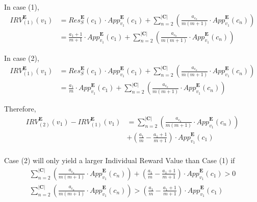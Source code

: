 \documentclass{article}
\begin{document}
In case (1), 
\begin{equation}
\begin{aligned}
{IRV}^{\boldsymbol{E}}_{(1)}(v_1) 
&= {Res}^{\boldsymbol{E}}_{S}(c_1)\cdot{App}^{\boldsymbol{E}}_{v_1}(c_1) + \sum^{|\boldsymbol{C}|}_{n = 2}{\left(\frac{a_{c_n}}{m(m+1)}\cdot{App}^{\boldsymbol{E}}_{v_1}(c_{n})\right)}\\
&= \frac{a_1+1}{m+1}\cdot{App}^{\boldsymbol{E}}_{v_1}(c_1) + \sum^{|\boldsymbol{C}|}_{n = 2}{\left(\frac{a_{c_n}}{m(m+1)}\cdot{App}^{\boldsymbol{E}}_{v_1}(c_{n})\right)}
\end{aligned}  
\end{equation}

In case (2), 
\begin{equation}
\begin{aligned}
{IRV}^{\boldsymbol{E}}_{(1)}(v_1) 
&= {Res}^{\boldsymbol{E}}_{S}(c_1)\cdot{App}^{\boldsymbol{E}}_{v_1}(c_1) + \sum^{|\boldsymbol{C}|}_{n = 2}{\left(\frac{a_{c_n}}{m(m+1)}\cdot{App}^{\boldsymbol{E}}_{v_1}(c_{n})\right)}\\
&= \frac{a_1}{m}\cdot{App}^{\boldsymbol{E}}_{v_1}(c_1) + \sum^{|\boldsymbol{C}|}_{n = 2}{\left(\frac{a_{c_n}}{m(m+1)}\cdot{App}^{\boldsymbol{E}}_{v_1}(c_{n})\right)}
\end{aligned}  
\end{equation}

Therefore,
\begin{equation}\label{IRV_DIFF}
\begin{aligned}
{IRV}^{\boldsymbol{E}}_{(2)}(v_1) - {IRV}^{\boldsymbol{E}}_{(1)}(v_1)
&=  \sum^{|\boldsymbol{C}|}_{n = 2}{\left(\frac{a_{c_{n}}}{m(m+1)}\cdot{App}^{\boldsymbol{E}}_{v_1}(c_{n})\right)}\\
&+ \left(\frac{a_1}{m}-\frac{a_{1}+1}{m+1}\right)\cdot{App}^{\boldsymbol{E}}_{v_1}(c_1)\\
\end{aligned}  
\end{equation}

Case (2) will only yield a larger Individual Reward Value than Case (1) if 
\begin{gather}
\sum^{|\boldsymbol{C}|}_{n = 2}{\left(\frac{a_{c_{n}}}{m(m+1)}\cdot{App}^{\boldsymbol{E}}_{v_1}(c_{n})\right)} + \left(\frac{a_1}{m}-\frac{a_{1}+1}{m+1}\right)\cdot{App}^{\boldsymbol{E}}_{v_1}(c_1) > 0\nonumber\\
\sum^{|\boldsymbol{C}|}_{n = 2}{\left(\frac{a_{c_{n}}}{m(m+1)}\cdot{App}^{\boldsymbol{E}}_{v_1}(c_{n})\right)} > \left(\frac{a_1}{m}-\frac{a_{1}+1}{m+1}\right)\cdot{App}^{\boldsymbol{E}}_{v_1}(c_1)
\end{gather}
\end{document}
